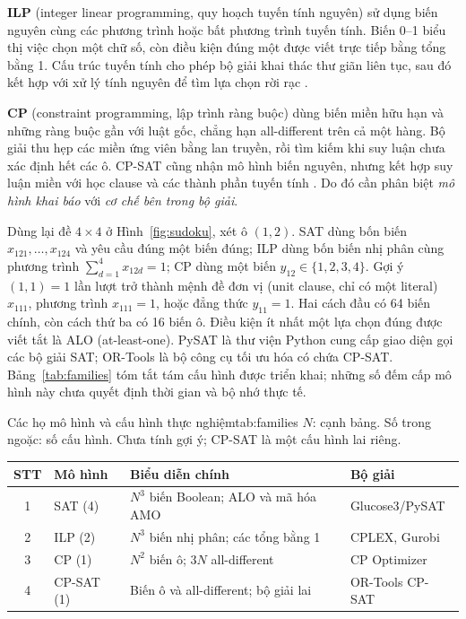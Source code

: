 \documentclass[a4paper]{cas-sc}
\begin{document}
\textbf{ILP} (integer linear programming, quy hoạch tuyến tính nguyên) sử dụng biến nguyên cùng các phương trình hoặc bất phương trình tuyến tính. Biến 0--1 biểu thị việc chọn một chữ số, còn điều kiện đúng một được viết trực tiếp bằng tổng bằng 1. Cấu trúc tuyến tính cho phép bộ giải khai thác thư giãn liên tục, sau đó kết hợp với xử lý tính nguyên để tìm lựa chọn rời rạc \citep{gurobiSudoku,cplexBranch}.

\textbf{CP} (constraint programming, lập trình ràng buộc) dùng biến miền hữu hạn và những ràng buộc gần với luật gốc, chẳng hạn all-different trên cả một hàng. Bộ giải thu hẹp các miền ứng viên bằng lan truyền, rồi tìm kiếm khi suy luận chưa xác định hết các ô. CP-SAT cũng nhận mô hình biến nguyên, nhưng kết hợp suy luận miền với học clause và các thành phần tuyến tính \citep{ibmCPManual,cpsat2023}. Do đó cần phân biệt \emph{mô hình khai báo} với \emph{cơ chế bên trong bộ giải}.

Dùng lại đề $4\times4$ ở Hình~\ref{fig:sudoku}, xét ô $(1,2)$. SAT dùng bốn biến $x_{121},\ldots,x_{124}$ và yêu cầu đúng một biến đúng; ILP dùng bốn biến nhị phân cùng phương trình $\sum_{d=1}^{4}x_{12d}=1$; CP dùng một biến $y_{12}\in\{1,2,3,4\}$. Gợi ý $(1,1)=1$ lần lượt trở thành mệnh đề đơn vị (unit clause, chỉ có một literal) $x_{111}$, phương trình $x_{111}=1$, hoặc đẳng thức $y_{11}=1$. Hai cách đầu có 64 biến chính, còn cách thứ ba có 16 biến ô. Điều kiện ít nhất một lựa chọn đúng được viết tắt là ALO (at-least-one). PySAT là thư viện Python cung cấp giao diện gọi các bộ giải SAT; OR-Tools là bộ công cụ tối ưu hóa có chứa CP-SAT. Bảng~\ref{tab:families} tóm tắt tám cấu hình được triển khai; những số đếm cấp mô hình này chưa quyết định thời gian và bộ nhớ thực tế.

\begin{reporttable}{Các họ mô hình và cấu hình thực nghiệm}{tab:families}{%
$N$: cạnh bảng. Số trong ngoặc: số cấu hình. Chưa tính gợi ý; CP-SAT là một cấu hình lai riêng.}
\begin{tabularx}{.85\linewidth}{|c|l|Y|>{\raggedright\arraybackslash}p{.20\linewidth}|}
\hline
\textbf{STT} & \textbf{Mô hình} & \textbf{Biểu diễn chính} & \textbf{Bộ giải}\\ & SAT (4) & $N^3$ biến Boolean; ALO và mã hóa AMO & Glucose3/PySAT\\
2 & ILP (2) & $N^3$ biến nhị phân; các tổng bằng 1 & CPLEX, Gurobi\\
3 & CP (1) & $N^2$ biến ô; $3N$ all-different & CP Optimizer\\
4 & CP-SAT (1) & Biến ô và all-different; bộ giải lai & OR-Tools CP-SAT\\\hline
\end{tabularx}
\end{reporttable}
\end{document}
